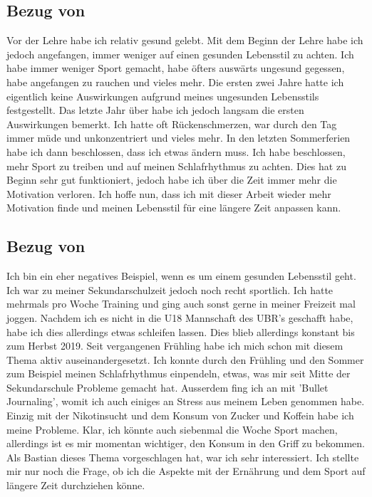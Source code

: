 \subsection{Bezug von \dario}
\authortoc{\dario}{\subsectionident}
\label{bezug:dario}
Vor der Lehre habe ich relativ gesund gelebt. Mit dem Beginn der Lehre habe ich jedoch angefangen, immer weniger auf einen gesunden Lebensstil zu achten.
\newline
Ich habe immer weniger Sport gemacht, habe öfters auswärts ungesund gegessen, habe angefangen zu rauchen und vieles mehr. 
\newline
Die ersten zwei Jahre hatte ich eigentlich keine Auswirkungen aufgrund meines ungesunden Lebensstils festgestellt.
\newline
Das letzte Jahr über habe ich jedoch langsam die ersten Auswirkungen bemerkt. Ich hatte oft Rückenschmerzen, war durch den Tag immer müde und unkonzentriert und vieles mehr.
\newline
In den letzten Sommerferien habe ich dann beschlossen, dass ich etwas ändern muss. Ich habe beschlossen, mehr Sport zu treiben und auf meinen Schlafrhythmus zu achten. 
\newline
Dies hat zu Beginn sehr gut funktioniert, jedoch habe ich über die Zeit immer mehr die Motivation verloren.
\newline
Ich hoffe nun, dass ich mit dieser Arbeit wieder mehr Motivation finde und meinen Lebensstil für eine längere Zeit anpassen kann.
\subsection{Bezug von \jonas}
\authortoc{\jonas}{\subsectionident}
\label{bezug:jonas}
Ich bin ein eher negatives Beispiel, wenn es um einem gesunden Lebensstil geht. Ich war zu meiner Sekundarschulzeit jedoch noch recht sportlich. Ich hatte mehrmals pro Woche Training und ging auch sonst gerne in meiner Freizeit mal joggen. Nachdem ich es nicht in die U18 Mannschaft des UBR's geschafft habe, habe ich dies allerdings etwas schleifen lassen.
\newline
Dies blieb allerdings konstant bis zum Herbst 2019. Seit vergangenen Frühling habe ich mich schon mit diesem Thema aktiv auseinandergesetzt. Ich konnte durch den Frühling und den Sommer zum Beispiel meinen Schlafrhythmus einpendeln, etwas, was mir seit Mitte der Sekundarschule Probleme gemacht hat. Ausserdem fing ich an mit 'Bullet Journaling', womit ich auch einiges an Stress aus meinem Leben genommen habe. Einzig mit der Nikotinsucht und dem Konsum von Zucker und Koffein habe ich meine Probleme. Klar, ich könnte auch siebenmal die Woche Sport machen, allerdings ist es mir momentan wichtiger, den Konsum in den Griff zu bekommen.
\newline
\newline
Als Bastian dieses Thema vorgeschlagen hat, war ich sehr interessiert. Ich stellte mir nur noch die Frage, ob ich die Aspekte mit der Ernährung und dem Sport auf längere Zeit durchziehen könne.